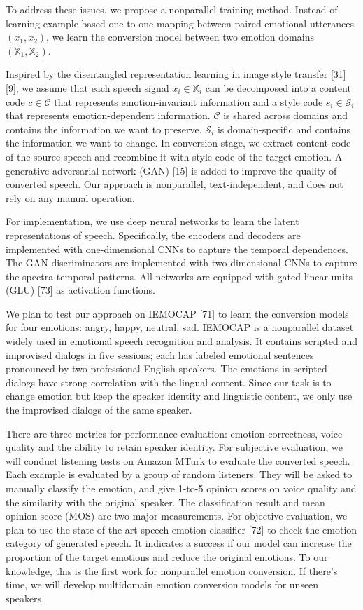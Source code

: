 \documentclass{article}
\begin{document}
To address these issues, we propose a nonparallel training method. Instead of learning example based one-to-one mapping between paired emotional utterances $(x_1, x_2)$, we learn the conversion model between two emotion domains $(\mathbb{X}_1, \mathbb{X}_2)$.

Inspired by the disentangled representation learning in image style transfer [31][9], we assume that each speech signal $x_i \in \mathbb{X}_i$ can be decomposed into a content code $c \in \mathcal{C}$ that represents emotion-invariant information and a style code $s_i \in \mathcal{S}_i$ that represents emotion-dependent information. $\mathcal{C}$ is shared across domains and contains the information we want to preserve. $\mathcal{S}_i$ is domain-specific and contains the information we want to change. In conversion stage, we extract content code of the source speech and recombine it with style code of the target emotion. A generative adversarial network (GAN) [15] is added to improve the quality of converted speech. Our approach is nonparallel, text-independent, and does not rely on any manual operation.

For implementation, we use deep neural networks to learn the latent representations of speech. Specifically, the encoders and decoders are implemented with one-dimensional CNNs to capture the temporal dependences. The GAN discriminators are implemented with two-dimensional CNNs to capture the spectra-temporal patterns. All networks are equipped with gated linear units (GLU) [73] as activation functions.

We plan to test our approach on IEMOCAP [71] to learn the conversion models for four emotions: angry, happy, neutral, sad. IEMOCAP is a nonparallel dataset widely used in emotional speech recognition and analysis. It contains scripted and improvised dialogs in five sessions; each has labeled emotional sentences pronounced by two professional English speakers. The emotions in scripted dialogs have strong correlation with the lingual content. Since our task is to change emotion but keep the speaker identity and linguistic content, we only use the improvised dialogs of the same speaker.

There are three metrics for performance evaluation: emotion correctness, voice quality and the ability to retain speaker identity. For subjective evaluation, we will conduct listening tests on Amazon MTurk to evaluate the converted speech. Each example is evaluated by a group of random listeners. They will be asked to manually classify the emotion, and give 1-to-5 opinion scores on voice quality and the similarity with the original speaker. The classification result and mean opinion score (MOS) are two major measurements. For objective evaluation, we plan to use the state-of-the-art speech emotion classifier [72] to check the emotion category of generated speech. It indicates a success if our model can increase the proportion of the target emotions and reduce the original emotions.  To our knowledge, this is the first work for nonparallel emotion conversion. If there's time, we will develop multidomain emotion conversion models for unseen speakers.
\end{document}
